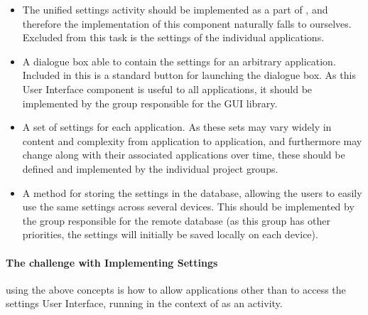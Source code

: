 \begin{itemize}
	\item The unified settings activity should be implemented as a part of \launcher, and therefore the implementation of this component naturally falls to ourselves. 
	Excluded from this task is the settings of the individual applications.
	\item A dialogue box able to contain the settings for an arbitrary \giraf application. Included in this is a standard button for launching the dialogue box. 
	As this User Interface component is useful to all applications, it should be implemented by the group responsible for the \giraf GUI library.
	
	\item A set of settings for each \giraf application.
	As these sets may vary widely in content and complexity from application to application, and furthermore may change along with their associated applications over time, these should be defined and implemented by the individual project groups. 
	\item A method for storing the settings in the database, allowing the users to easily use the same settings across several devices. 
	This should be implemented by the group responsible for the remote database (as this group has other priorities, the settings will initially be saved locally on each device).
\end{itemize}

\paragraph{The challenge with Implementing Settings} using the above concepts is how to allow applications other than \launcher to access the settings User Interface, running in the context of \launcher as an activity.

